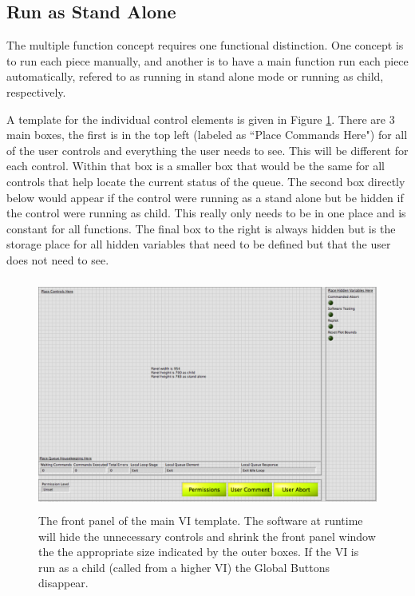 \subsection{Run as Stand Alone}

The multiple function concept requires one functional distinction. One concept is to run each piece manually, and another is to have a main function run each piece automatically, refered to as running in stand alone mode or running as child, respectively.   

A template for the individual control elements is given in Figure \ref{Fig:VITemplate}. There are 3 main boxes, the first is in the top left (labeled as ``Place Commands Here") for all of the user controls and everything the user needs to see. This will be different for each control. Within that box is a smaller box that would be the same for all controls that help locate the current status of the queue. The second box directly below would appear if the control were running as a stand alone but be hidden if the control were running as child. This really only needs to be in one place and is constant for all functions. The final box to the right is always hidden but is the storage place for all hidden variables that need to be defined but that the user does not need to see. 

\begin{figure}[!ht]\centering
\includegraphics[height=3in]{Figures/MainVITemplate}
\caption{The front panel of the main VI template. The software at runtime will hide the unnecessary controls and shrink the front panel window the the appropriate size indicated by the outer boxes. If the VI is run as a child (called from a higher VI) the Global Buttons disappear. }\label{Fig:VITemplate}
\end{figure}

